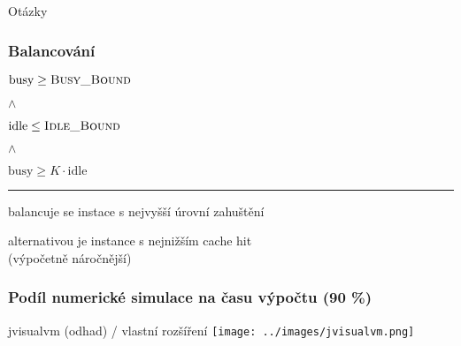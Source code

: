 \documentclass[xcolor=svgnames]{beamer}
\begin{document}
\begin{frame}
	\begin{center}
		{\Huge Otázky}
	\end{center}
\end{frame}
\begin{frame}
	\frametitle{Balancování}
	\begin{center}
		{\large
			$\textrm{busy} \geq \textsc{Busy\_Bound}$
		 	
			$\wedge$
			
			$\textrm{idle} \leq \textsc{Idle\_Bound}$
			
			$\wedge$
			
			$\textrm{busy} \geq K \cdot \textrm{idle}$
		}

		\bigskip
		\hrule
		\bigskip

		balancuje se instace s nejvyšší úrovní zahuštění

		\bigskip

		alternativou je instance s nejnižším cache hit\\
		(výpočetně náročnější)
	\end{center}
\end{frame}
\begin{frame}
	\frametitle{Podíl numerické simulace na času výpočtu (90 \%)}
	\begin{center}
		jvisualvm (odhad) / vlastní rozšíření
		\texttt{[image: ../images/jvisualvm.png]}
	\end{center}
\end{frame}
\end{document}
